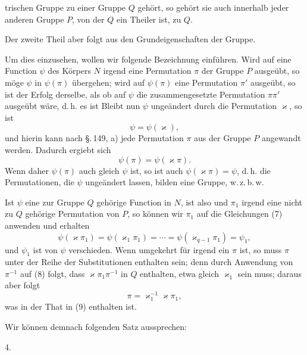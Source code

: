 
trischen Gruppe zu einer Gruppe $Q$ gehört, so gehört sie auch innerhalb jeder anderen Gruppe $P$, von der $Q$ ein Theiler ist, zu $Q$.

Der zweite Theil aber folgt aus den Grundeigenschaften der  Gruppe.

Um dies einzusehen, wollen wir folgende Bezeichnung einführen. Wird auf eine Function $\psi$ des Körpers $N$ irgend eine Permutation $\pi$ der Gruppe $P$ ausgeübt, so möge $\psi$ in $\psi(\pi)$ übergehen; wird auf $\psi(\pi)$ eine Permutation $\pi'$ ausgeübt, so ist der Erfolg derselbe, als ob auf $\psi$ die zusammengesetzte Permutation $\pi\pi'$ ausgeübt wäre, d.\,h. es ist
Bleibt nun $\psi$ ungeändert durch die Permutation $\varkappa$, so ist
\[
\psi = \psi(\varkappa),
\]
und hierin kann nach \S.\,149, a) jede Permutation $\pi$ aus der Gruppe $P$ angewandt werden. Dadurch ergiebt sich
\[
\psi(\pi) = \psi(\varkappa\pi).
\]
Wenn daher $\psi(\pi)$ auch gleich $\psi$ ist, so ist auch $\psi(\varkappa\pi) = \psi$, d.\,h. die Permutationen, die $\psi$ ungeändert lassen, bilden eine Gruppe, w.\,z.\,b.\,w.

Ist $\psi$ eine zur Gruppe $Q$ gehörige Function in $N$, ist also
und $\pi_1$ irgend eine nicht zu $Q$ gehörige Permutation von $P$, so können wir $\pi_1$ auf die Gleichungen (7) anwenden und erhalten
\[
\psi(\varkappa\pi_1) = \psi(\varkappa_1\pi_1) = \cdots = \psi(\varkappa_{q-1}\pi_1) = \psi_1,
\]
und $\psi_1$ ist von $\psi$ verschieden. Wenn umgekehrt für irgend ein $\pi$
ist, so muss $\pi$ unter der Reihe der Substitutionen
enthalten sein; denn durch Anwendung von $\pi^{-1}$ auf (8) folgt, dass $\varkappa\pi_1\pi^{-1}$ in $Q$ enthalten, etwa gleich $\varkappa_1$ sein muss; daraus aber folgt
\[
\pi = \varkappa_1^{-1}\varkappa\pi_1,
\]
was in der That in (9) enthalten ist.

Wir können demnach folgenden Satz aussprechen:

4. 
